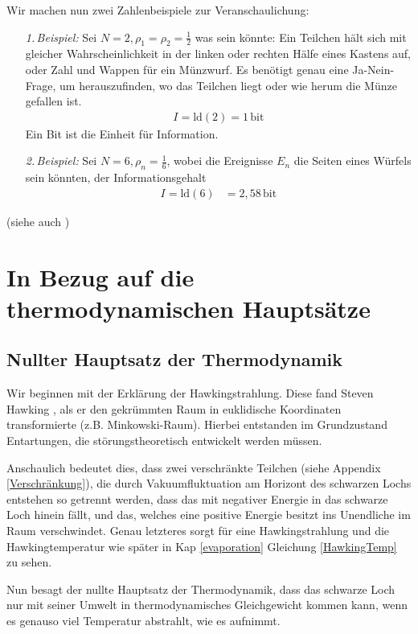 \documentclass[ngerman]{scrartcl}
\begin{document}
Wir machen nun zwei Zahlenbeispiele zur Veranschaulichung:
	\begin{itemize}
		\item[\textit{1.\,Beispiel:}] Sei $N=2, \rho_1 = \rho_2= \frac{1}{2}$ was sein könnte: Ein Teilchen hält sich mit gleicher Wahrscheinlichkeit in der linken oder rechten Hälfe eines Kastens auf, oder Zahl und Wappen für ein Münzwurf.
		Es benötigt genau eine Ja-Nein-Frage, um herauszufinden, wo das Teilchen liegt oder wie herum die Münze gefallen ist.
			\begin{align*}
				I = \mathrm{ld}(2) = 1 \,\mathrm{bit}
			\end{align*}
		Ein Bit ist die Einheit für Information.
		\item[\textit{2.\,Beispiel:}]Sei $N=6, \rho_n = \frac{1}{6}$, wobei die Ereignisse $E_n$ die Seiten eines Würfels sein könnten, der Informationsgehalt
			\begin{align*}
				I = \mathrm{ld}(6) &= 2,58 \,\mathrm{bit}
			\end{align*}
	\end{itemize}
(siehe auch \cite{Brenig})

\section{In Bezug auf die thermodynamischen Hauptsätze \checkmark}
	\subsection{Nullter Hauptsatz der Thermodynamik}
	Wir beginnen mit der Erklärung der Hawkingstrahlung. Diese fand Steven Hawking \cite{ParticleCreation}, als er den gekrümmten Raum in euklidische Koordinaten transformierte (z.B. Minkowski-Raum). Hierbei entstanden im Grundzustand Entartungen, die störungstheoretisch entwickelt werden müssen. 
	
	Anschaulich bedeutet dies, dass zwei verschränkte Teilchen (siehe Appendix \ref{Verschränkung}), die durch Vakuumfluktuation am Horizont des schwarzen Lochs entstehen so getrennt werden, dass das mit negativer Energie in das schwarze Loch hinein fällt, und das, welches eine positive Energie besitzt ins Unendliche im Raum verschwindet. 
	Genau letzteres sorgt für eine Hawkingstrahlung und die Hawkingtemperatur wie später in Kap \ref{evaporation} Gleichung \eqref{HawkingTemp} zu sehen.
	
	Nun besagt der nullte Hauptsatz der Thermodynamik, dass das schwarze Loch nur mit seiner Umwelt in thermodynamisches Gleichgewicht kommen kann, wenn es genauso viel Temperatur abstrahlt, wie es aufnimmt. 
	
\end{document}
